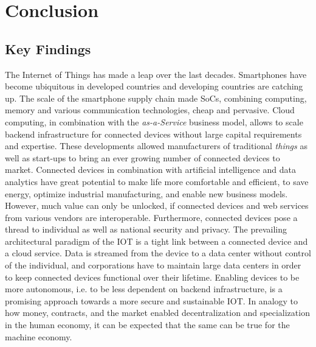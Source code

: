 \chapter{Conclusion}
\label{sec:discussion}

\section{Key Findings}

The Internet of Things has made a leap over the last decades. Smartphones have become ubiquitous in developed countries and developing countries are catching up. The scale of the smartphone supply chain made \ac{SoC}s, combining computing, memory and various communication technologies, cheap and pervasive. Cloud computing, in combination with the \emph{as-a-Service} business model, allows to scale backend infrastructure for connected devices without large capital requirements and expertise. These developments allowed manufacturers of traditional \emph{things} as well as start-ups to bring an ever growing number of connected devices to market. Connected devices in combination with artificial intelligence and data analytics have great potential to make life more comfortable and efficient, to save energy, optimize industrial manufacturing, and enable new business models. However, much value can only be unlocked, if connected devices and web services from various vendors are interoperable. Furthermore, connected devices pose a thread to individual as well as national security and privacy. 
The prevailing architectural paradigm of the \ac{IOT} is a tight link between a connected device and a cloud service. Data is streamed from the device to a data center without control of the individual, and corporations have to maintain large data centers in order to keep connected devices functional over their lifetime. 
Enabling devices to be more autonomous, i.e. to be less dependent on backend infrastructure, is a promising approach towards a more secure and sustainable \ac{IOT}. In analogy to how money, contracts, and the market enabled decentralization and specialization in the human economy, it can be expected that the same can be true for the machine economy. 

